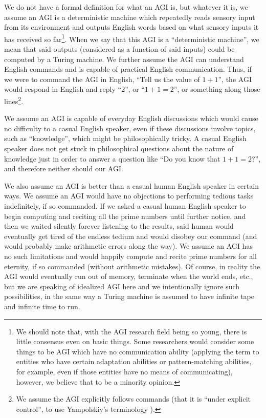 \documentclass[runningheads]{llncs}
\begin{document}
We do not have a formal definition for what an AGI is, but whatever it is,
we assume an AGI is a deterministic machine
which repeatedly reads sensory input from its environment and outputs
English words based on what sensory inputs it has received so
far\footnote{We should note that, with the AGI research field being so young,
there is little consensus even on basic things. Some researchers would
consider some things to be AGI which have no communication ability (applying the
term to entities who have certain adaptation abilities or
pattern-matching abilities, for example, even if those entities have no
means of communicating), however, we believe that to be a minority opinion.}.
When we say that this AGI is a ``deterministic machine'', we mean that
said outputs (considered as a function of said inputs) could be computed
by a Turing machine. We further assume the AGI can understand English
commands and is capable of practical English communication. Thus, if
we were to command the AGI in English, ``Tell us the value of $1+1$'',
the AGI would respond in English and reply ``$2$'', or ``$1+1=2$'',
or something along those lines\footnote{We assume the AGI explicitly follows
commands (that it is ``under explicit control'', to use Yampolskiy's
terminology \cite{yampolskiycontrol}).}.

We assume an AGI is capable of everyday English discussions
which would cause no difficulty to a casual English speaker, even if
these discussions involve topics, such as ``knowledge'', which
might be philosophically tricky. A casual English speaker does not get
stuck in philosophical questions about the nature of knowledge
just in order to answer a question like ``Do you know that $1+1=2$?'',
and therefore neither should our AGI.

We also assume an AGI is better than a casual human English speaker in certain ways.
We assume an AGI would have no objections to performing tedious
tasks indefinitely, if so commanded. If we asked a casual human English speaker to
begin computing and reciting all the prime numbers until further notice, and
then we waited silently forever listening to the results, said human would eventually
get tired of the endless tedium and would disobey our command (and would probably
make arithmetic errors along the way). We assume an AGI
has no such limitations and would happily compute and recite prime numbers for
all eternity, if so commanded (without arithmetic mistakes). Of course,
in reality the AGI would eventually run out of memory, terminate when the world ends,
etc., but we are speaking of idealized AGI here and we
intentionally ignore such possibilities, in the same way a Turing machine is
assumed to have infinite tape and infinite time to run.
\end{document}
